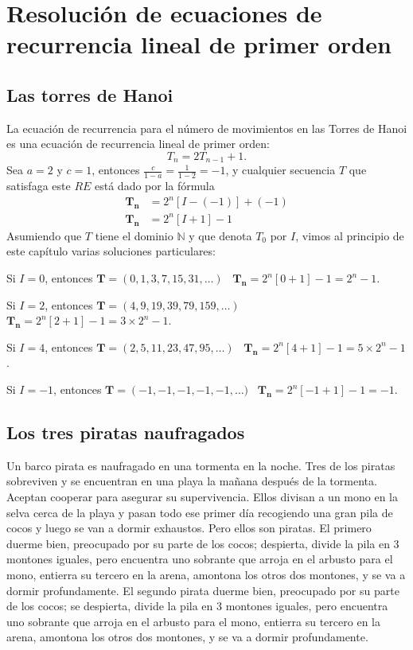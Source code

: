 \section{Resolución de ecuaciones de recurrencia lineal de primer orden}

\subsection{Las torres de Hanoi}

La ecuación de recurrencia para el número de movimientos en las Torres de Hanoi es una ecuación de recurrencia lineal de primer orden:
\begin{equation*}
	T_{n}=2T_{n-1}+1.
\end{equation*}
Sea $a=2$ y $c=1$, entonces $\tfrac{c}{1-a}=\tfrac{1}{1-2}=-1$, y cualquier secuencia $T$ que satisfaga este $RE$ está dado por la fórmula
\begin{align*}
	\bm{T_{n}}&=2^{n}\left[I-(-1)\right]+(-1)\\
	\bm{T_{n}}&=2^{n}\left[I+1\right]-1
\end{align*}
Asumiendo que $T$ tiene el dominio $\mathds{N}$ y que denota $T_0$ por $I$, vimos al principio de este capítulo varias soluciones particulares:

Si $I=0$, entonces $\bm{T}=\left(0,1,3,7,15,31,\ldots\right)$ \ $\bm{T_{n}}=2^{n}[0+1]-1=2^n-1$.

Si $I=2$, entonces $\bm{T}=\left(4,9,19,39,79,159,\ldots\right)$ \ $\bm{T_{n}}=2^{n}[2+1]-1=3\times2^n -1$.

Si $I=4$, entonces $\bm{T}=\left(2,5,11,23,47,95,\ldots\right)$ \ $\bm{T_{n}}=2^{n}[4+1]-1=5\times2^n -1$.

Si $I=-1$, entonces $\bm{T}=\left(-1,-1,-1,-1,-1,\ldots)$ \ $\bm{T_n}=2^{n}\left[-1+1\right]-1=-1$.

\subsection{Los tres piratas naufragados}

Un barco pirata es naufragado en una tormenta en la noche. Tres de los piratas sobreviven y se encuentran en una playa la mañana después de la tormenta. Aceptan cooperar para asegurar su supervivencia. Ellos divisan a un mono en la selva cerca de la playa y pasan todo ese primer día recogiendo una gran pila de cocos y luego se van a dormir exhaustos. Pero ellos son piratas. El primero duerme bien, preocupado por su parte de los cocos; despierta, divide la pila en 3 montones iguales, pero encuentra uno sobrante que arroja en el arbusto para el mono, entierra su tercero en la arena, amontona los otros dos montones, y se va a dormir profundamente. El segundo pirata duerme bien, preocupado por su parte de los cocos; se despierta, divide la pila en 3 montones iguales, pero encuentra uno sobrante que arroja en el arbusto para el mono, entierra su tercero en la arena, amontona los otros dos montones, y se va a dormir profundamente.


